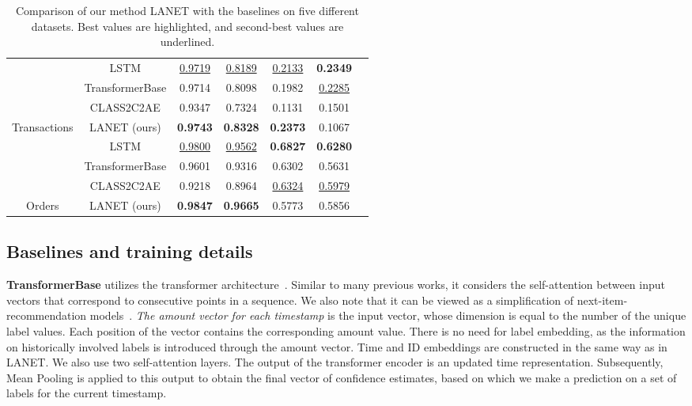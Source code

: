 \documentclass[runningheads]{llncs}
\begin{document}
\begin{table*}[t]
\begin{tabular}{ccccccc}
& LSTM &  \underline{0.9719}  & \underline{0.8189} & \underline{0.2133} & \textbf{0.2349} \\
& TransformerBase & 0.9714  & 0.8098 & 0.1982 & \underline{0.2285} &\\
& CLASS2C2AE & 0.9347 & 0.7324 & 0.1131 & 0.1501 \\
\multirow{-4}{*}{Transactions} & LANET (ours) & \textbf{0.9743}  & \textbf{0.8328} & \textbf{0.2373} & 0.1067 \\ \hline

& LSTM & \underline{0.9800}  & \underline{0.9562} & \textbf{0.6827} & \textbf{0.6280} \\
& TransformerBase & 0.9601 & 0.9316 & 0.6302 & 0.5631 \\
& CLASS2C2AE & 0.9218 & 0.8964 & \underline{0.6324} & \underline{0.5979} \\
\multirow{-5}{*}{Orders} & LANET (ours) & \textbf{0.9847} & \textbf{0.9665} & 0.5773 & 0.5856 \\ 

\hline

\end{tabular}
\centering
\caption{Comparison of our method LANET with the baselines on five different datasets.
Best values are highlighted, and second-best values are underlined.
}
\label{table:diff_data}
\end{table*}

\subsection{Baselines and training details} 
\label{sec:based_transf}

\textbf{TransformerBase} utilizes the transformer architecture~\cite{vaswani2017attention}. Similar to many previous works, it considers the self-attention between input vectors that correspond to consecutive points in a sequence. We also note that it can be viewed as a simplification of next-item-recommendation models~\cite{li2020time}.
\emph{The amount vector for each timestamp} is the input vector, whose dimension is equal to the number of the unique label values. Each position of the vector contains the corresponding amount value.
There is no need for label embedding, as the information on historically involved labels is introduced through the amount vector. Time and ID embeddings are constructed in the same way as in LANET.
We also use two self-attention layers.
The output of the transformer encoder is an updated time representation. Subsequently, Mean Pooling is applied to this output to obtain the final vector of confidence estimates, based on which we make a prediction on a set of labels for the current timestamp.
\end{document}
